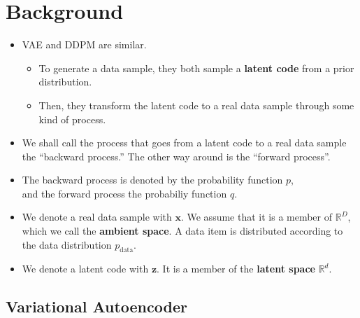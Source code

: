 \documentclass[10pt]{article}
\newcommand{\ve}[1]{\mathbf{#1}}
\newcommand{\Real}{\mathbb{R}}
\newcommand{\data}{\mathrm{data}}
\begin{document}
\section{Background}

\begin{itemize}
  \item VAE and DDPM are similar.
  \begin{itemize}
    \item To generate a data sample, they both sample a {\bf latent code} from a prior distribution.
    
    \item Then, they transform the latent code to a real data sample through some kind of process.
  \end{itemize}

  \item We shall call the process that goes from a latent code to a real data sample the ``backward process.'' The other way around is the ``forward process''.
  
  \item The backward process is denoted by the probability function $p$,\\ 
  and the forward process the probabiliy function $q$.

  \item We denote a real data sample with $\ve{x}$. We assume that it is a member of $\Real^D$, which we call the {\bf ambient space}. A data item is distributed according to the data distribution $p_{\data}$.
  
  \item We denote a latent code with $\ve{z}$. It is a member of the {\bf latent space} $\Real^d$.
\end{itemize}

\subsection{Variational Autoencoder}
\end{document}
